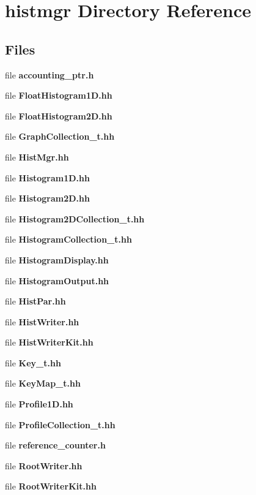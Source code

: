 \section{histmgr Directory Reference}
\label{dir_6f900f67fce82d52802c727faf95c5e5}
\subsection*{Files}
\begin{DoxyCompactItemize}
\item 
file {\bfseries accounting\-\_\-ptr.\-h}
\item 
file {\bfseries Float\-Histogram1\-D.\-hh}
\item 
file {\bfseries Float\-Histogram2\-D.\-hh}
\item 
file {\bfseries Graph\-Collection\-\_\-t.\-hh}
\item 
file {\bfseries Hist\-Mgr.\-hh}
\item 
file {\bfseries Histogram1\-D.\-hh}
\item 
file {\bfseries Histogram2\-D.\-hh}
\item 
file {\bfseries Histogram2\-D\-Collection\-\_\-t.\-hh}
\item 
file {\bfseries Histogram\-Collection\-\_\-t.\-hh}
\item 
file {\bfseries Histogram\-Display.\-hh}
\item 
file {\bfseries Histogram\-Output.\-hh}
\item 
file {\bfseries Hist\-Par.\-hh}
\item 
file {\bfseries Hist\-Writer.\-hh}
\item 
file {\bfseries Hist\-Writer\-Kit.\-hh}
\item 
file {\bfseries Key\-\_\-t.\-hh}
\item 
file {\bfseries Key\-Map\-\_\-t.\-hh}
\item 
file {\bfseries Profile1\-D.\-hh}
\item 
file {\bfseries Profile\-Collection\-\_\-t.\-hh}
\item 
file {\bfseries reference\-\_\-counter.\-h}
\item 
file {\bfseries Root\-Writer.\-hh}
\item 
file {\bfseries Root\-Writer\-Kit.\-hh}
\end{DoxyCompactItemize}
